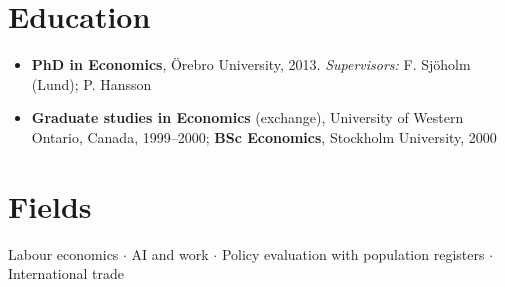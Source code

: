 \documentclass[11pt,a4paper]{article}
\newcommand{\cventry}[1]{\item #1}
\begin{document}
\section{Education}
\vspace{-2pt}
\begin{itemize}
 \cventry{\textbf{PhD in Economics}, Örebro University, 2013. \textit{Supervisors:} F. Sjöholm (Lund); P. Hansson}
 \cventry{\textbf{Graduate studies in Economics} (exchange), University of Western Ontario, Canada, 1999--2000; \textbf{BSc Economics}, Stockholm University, 2000}
\end{itemize}

\section{Fields}
\vspace{-2pt}
Labour economics $\cdot$ AI and work $\cdot$ Policy evaluation with population registers $\cdot$ International trade

\end{document}
